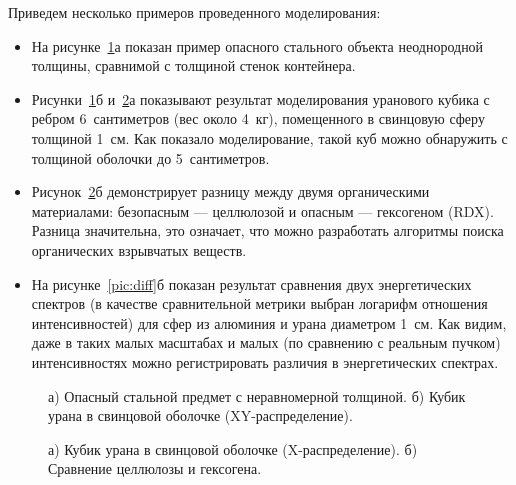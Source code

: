 Приведем несколько примеров проведенного моделирования:
\begin{itemize}
    \item На рисунке~\ref{pic:sword}а показан пример опасного стального объекта неоднородной толщины, сравнимой с толщиной стенок контейнера.
    \item Рисунки~\ref{pic:sword}б и~\ref{pic:hex}а показывают результат моделирования уранового кубика с ребром 6~сантиметров (вес около 4~кг), помещенного в свинцовую сферу толщиной 1~см. Как показало моделирование, такой куб можно обнаружить с толщиной оболочки до 5~сантиметров.
    \item Рисунок~\ref{pic:hex}б демонстрирует разницу между двумя органическими материалами: безопасным --- целлюлозой и опасным --- гексогеном (RDX). Разница значительна, это означает, что можно разработать алгоритмы поиска органических взрывчатых веществ.
    \item На рисунке~\ref{pic:diff}б показан результат сравнения двух энергетических спектров (в качестве сравнительной метрики выбран логарифм отношения интенсивностей) для сфер из алюминия и урана диаметром 1~см. Как видим, даже в таких малых масштабах и малых (по сравнению с реальным пучком) интенсивностях можно регистрировать различия в энергетических спектрах.
\end{itemize}
\begin{figure}[t]
    \begin{center}
        \begin{minipage}[h]{0.49\linewidth}
        \end{minipage}
        \hfill
        \begin{minipage}[h]{0.49\linewidth}
        \end{minipage}         
        \caption{а) Опасный стальной предмет с неравномерной толщиной. б) Кубик урана в свинцовой оболочке (XY-распределение).}
    \end{center}
    \label{pic:sword}
\end{figure}
\begin{figure}[t]
    \begin{center}
        \begin{minipage}[h]{0.49\linewidth}
        \end{minipage}
        \hfill
        \begin{minipage}[h]{0.49\linewidth}
        \end{minipage}
        \caption{а) Кубик урана в свинцовой оболочке (X-распределение). б) Сравнение целлюлозы и гексогена.}
    \end{center}
    \label{pic:hex}
\end{figure}
